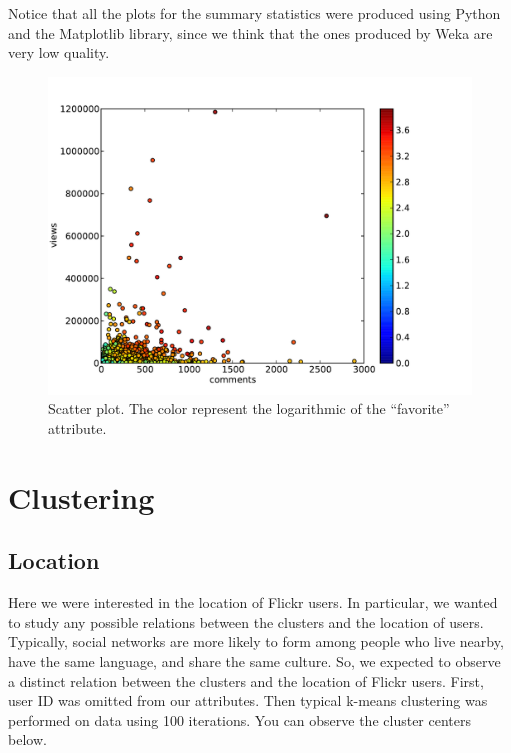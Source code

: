 \documentclass[letter,12pt]{article}
\begin{document}
Notice that all the plots for the summary statistics were produced using Python and the Matplotlib library, since we think that the ones produced by Weka are very low quality.

\begin{figure}[!h]
\centering
\includegraphics[scale=0.6]{scatter.pdf}
\caption{Scatter plot. The color represent the logarithmic of the ``favorite'' attribute.}
\label{fig:scatter}
\end{figure}

\section{Clustering}

\subsection{Location}

Here we were interested in the location of Flickr users. In particular,
we wanted to study any possible relations between the clusters and
the location of users. Typically, social networks are more likely
to form among people who live nearby, have the same language, and share
the same culture. So, we expected to observe a distinct relation between
the clusters and the location of Flickr users. First, user ID was
omitted from our attributes. Then typical k-means clustering was performed
on data using 100 iterations. You can observe the cluster centers
below.
\end{document}
